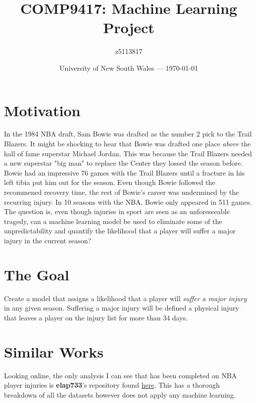 \documentclass{article}
\title{COMP9417: Machine Learning Project} %
\author{z5113817} %
\date{University of New South Wales --- \today} %
\newcommand{\injurydef}{a physical injury that leaves a player on the injury list for more than 34 days}
\begin{document}
\maketitle %



\section*{Motivation}

In the 1984 NBA draft, Sam Bowie was drafted as the number 2 pick to the Trail Blazers.
It might be shocking to hear that Bowie was drafted one place \emph{above} the hall of fame superstar Michael Jordan.
This was because the Trail Blazers needed a new superstar "big man" to replace the Center they lossed the season before.
Bowie had an impressive 76 games with the Trail Blazers until a fracture in his left tibia put him out for the season.
Even though Bowie followed the recommened recovery time, the rest of Bowie's career was undermined by the recurring injury.
In 10 seasons with the NBA, Bowie only appeared in 511 games.\\

The question is, even though injuries in sport are seen as an unforeseeable tragedy, can a
machine learning model be used to eliminate some of the unpredictability and quantify
the likelihood that a player will suffer a major injury in the current season?

\section*{The Goal}

Create a model that assigns a likelihood that a player will \emph{suffer a major injury}
in any given season. Suffering a major injury will be defined \injurydef.

\section*{Similar Works}

Looking online, the only analysis I can see that has been completed on NBA  player injuries
is \textbf{elap733}'s repository found \href{https://github.com/elap733/NBA-Injuries-Analysis/tree/master/src/d01_scrapes}{here}. 
This has a thorough breakdown of all the datasets however does not apply any machine learning.
\end{document}

